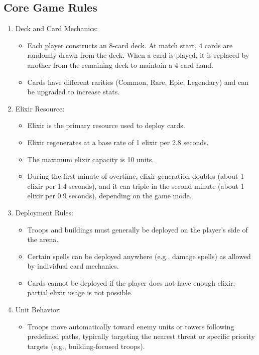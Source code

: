 \documentclass{article}
\begin{document}
\subsection{Core Game Rules}
\begin{enumerate}[label=\arabic*.]
    \item Deck and Card Mechanics:
    \begin{itemize}
        \item Each player constructs an 8-card deck. At match start, 4 cards are randomly drawn from the deck. When a card is played, it is replaced by another from the remaining deck to maintain a 4-card hand.
        \item Cards have different rarities (Common, Rare, Epic, Legendary) and can be upgraded to increase stats.
    \end{itemize}
    \item Elixir Resource:
    \begin{itemize}
        \item Elixir is the primary resource used to deploy cards.
        \item Elixir regenerates at a base rate of 1 elixir per 2.8 seconds.
        \item The maximum elixir capacity is 10 units.
        \item During the first minute of overtime, elixir generation doubles (about 1 elixir per 1.4 seconds), and it can triple in the second minute (about 1 elixir per 0.9 seconds), depending on the game mode.
    \end{itemize}
    \item Deployment Rules:
    \begin{itemize}
        \item Troops and buildings must generally be deployed on the player's side of the arena.
        \item Certain spells can be deployed anywhere (e.g., damage spells) as allowed by individual card mechanics.
        \item Cards cannot be deployed if the player does not have enough elixir; partial elixir usage is not possible.
    \end{itemize}
    \item Unit Behavior:
    \begin{itemize}
        \item Troops move automatically toward enemy units or towers following predefined paths, typically targeting the nearest threat or specific priority targets (e.g., building-focused troops).

\end{itemize}
\end{enumerate}
\end{document}

